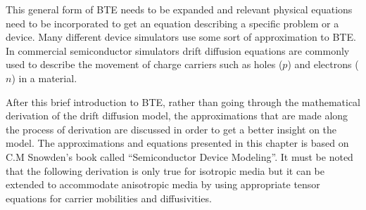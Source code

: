 \begin{doublespace}
This general form of BTE needs to be expanded and relevant physical equations need to be incorporated to get an equation describing a specific problem or a device. 
Many different device simulators use some sort of approximation to  BTE. In commercial semiconductor simulators drift diffusion equations are commonly used to describe the movement of charge carriers such as holes ($p$) and electrons ($n$) in a material\cite{Comsol}\cite{SILVACO}\cite{LumDev}. 

After this brief introduction to  BTE, rather than going through the mathematical derivation of the drift diffusion model, the approximations that are made along the process of derivation are discussed in order to get a better insight on the model. The approximations and equations presented in this chapter is based on C.M Snowden's book called ``Semiconductor Device Modeling''\cite{snowden}. It must be noted that the following derivation is only true for isotropic media but it can be extended to accommodate anisotropic media by using appropriate tensor equations for carrier mobilities and diffusivities.


\end{doublespace}
